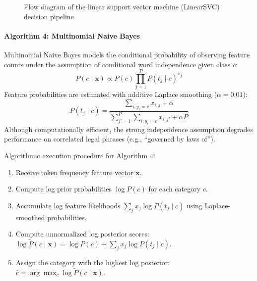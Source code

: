 \begin{figure}[htbp]
\centering
{}
\caption{Flow diagram of the linear support vector machine (LinearSVC) decision pipeline}\label{fig:tikz_linearsvc}
\end{figure}

\paragraph*{Algorithm 4: Multinomial Naive Bayes}
Multinomial Naive Bayes models the conditional probability of observing feature counts under the assumption of conditional word independence given class $c$:
\begin{equation}
    P(c \mid \mathbf{x}) \propto P(c) \prod_{j=1}^{P} P(t_j \mid c)^{x_j}
    \label{eq:nb_bayes}
\end{equation}
Feature probabilities are estimated with additive Laplace smoothing ($\alpha = 0.01$):
\begin{equation}
    P(t_j \mid c) = \frac{\sum_{i: y_i = c} x_{i,j} + \alpha}{\sum_{j'=1}^{P} \sum_{i: y_i = c} x_{i,j'} + \alpha P}
    \label{eq:nb_smoothing}
\end{equation}
Although computationally efficient, the strong independence assumption degrades performance on correlated legal phrases (e.g., ``governed by laws of'').

\noindent Algorithmic execution procedure for Algorithm 4:
\begin{enumerate}
    \item Receive token frequency feature vector $\mathbf{x}$.
    \item Compute log prior probabilities $\log P(c)$ for each category $c$.
    \item Accumulate log feature likelihoods $\sum_j x_j \log P(t_j \mid c)$ using Laplace-smoothed probabilities.
    \item Compute unnormalized log posterior scores: $\log \tilde{P}(c \mid \mathbf{x}) = \log P(c) + \sum_j x_j \log P(t_j \mid c)$.
    \item Assign the category with the highest log posterior: $\hat{c} = \arg\max_c \log \tilde{P}(c \mid \mathbf{x})$.
\end{enumerate}

